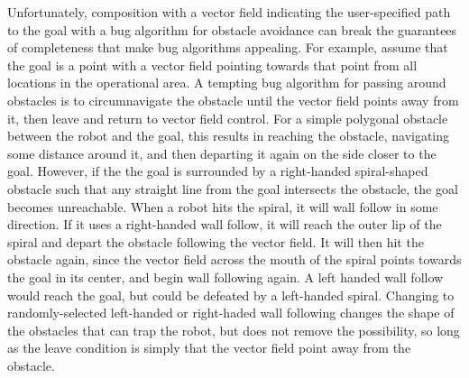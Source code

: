 Unfortunately, composition with a vector field indicating the user-specified path to the goal with a bug algorithm for obstacle avoidance can break the guarantees of completeness that make bug algorithms appealing. 
For example, assume that the goal is a point with a vector field pointing towards that point from all locations in the operational area. 
A tempting bug algorithm for passing around obstacles is to circumnavigate the obstacle until the vector field points away from it, then leave and return to vector field control. 
For a simple polygonal obstacle between the robot and the goal, this results in reaching the obstacle, navigating some distance around it, and then departing it again on the side closer to the goal. 
However, if the the goal is surrounded by a right-handed spiral-shaped obstacle such that any straight line from the goal intersects the obstacle, the goal becomes unreachable. 
When a robot hits the spiral, it will wall follow in some direction.
If it uses a right-handed wall follow, it will reach the outer lip of the spiral and depart the obstacle following the vector field. It will then hit the obstacle again, since the vector field across the mouth of the spiral points towards the goal in its center, and begin wall following again. 
A left handed wall follow would reach the goal, but could be defeated by a left-handed spiral. 
Changing to randomly-selected left-handed or right-haded wall following changes the shape of the obstacles that can trap the robot, but does not remove the possibility, so long as the leave condition is simply that the vector field point away from the obstacle. 

